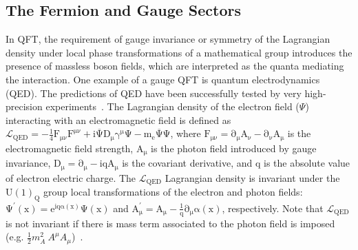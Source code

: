 \subsection{The Fermion and Gauge Sectors}
In QFT, the requirement of gauge invariance or symmetry of the Lagrangian density under local phase transformations of a mathematical group introduces the presence of massless boson fields, which are interpreted as the quanta mediating the interaction. One example of a gauge QFT is quantum electrodynamics (QED). The predictions of QED have been successfully tested by very high-precision experiments~\cite{Karshenboim:2005iy}. The Lagrangian density of the electron field ($\Psi$) interacting with an electromagnetic field is defined as $\mathrm{\mathcal{L}_{QED}=-\frac{1}{4}F_{\mu\nu}F^{\mu\nu} + i\overline{\Psi} D_{\mu} \gamma^{\mu} \Psi - m_{e}\overline{\Psi}\Psi }$, where $\mathrm{F_{\mu\nu}=\partial_{\mu}A_{\nu}-\partial_{\nu}A_{\mu} }$ is the electromagnetic field strength, $\mathrm{A_{\mu}}$ is the photon field introduced by gauge invariance, $\mathrm{ D_{\mu}=\partial_{\mu}-iqA_{\mu} }$ is the covariant derivative, and q is the absolute value of electron electric charge. The $\mathrm{\mathcal{L}_{QED}}$ Lagrangian density is invariant under the $\mathrm{U(1)_{Q}}$ group local transformations of the electron and photon fields: $\mathrm{\Psi^{'}(x)=e^{iq\alpha(x)}\Psi(x)}$ and $\mathrm{A^{'}_{\mu} = A_{\mu} - \frac{1}{q}\partial_{\mu}\alpha(x)}$, respectively. Note that $\mathrm{\mathcal{L}_{QED}}$ is not invariant if there is mass term associated to the photon field is imposed (e.g. $\frac{1}{2}m_{A}^{2}~A^{\mu}A_{\mu}$)~\cite{peskin,costa,pdg}.

